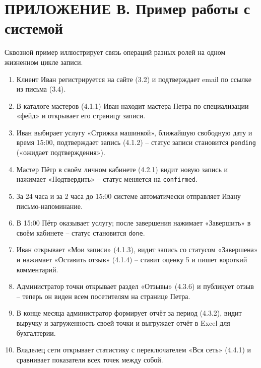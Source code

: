 \section*{ПРИЛОЖЕНИЕ В. Пример работы с системой}

Сквозной пример иллюстрирует связь операций разных ролей на одном
жизненном цикле записи.

\begin{enumerate}
  \item Клиент Иван регистрируется на сайте (3.2) и подтверждает email
        по ссылке из письма (3.4).
  \item В каталоге мастеров (4.1.1) Иван находит мастера Петра по
        специализации «фейд» и открывает его страницу записи.
  \item Иван выбирает услугу «Стрижка машинкой», ближайшую свободную дату
        и время 15:00, подтверждает запись (4.1.2) -- статус записи
        становится \texttt{pending} («ожидает подтверждения»).
  \item Мастер Пётр в своём личном кабинете (4.2.1) видит новую запись
        и нажимает «Подтвердить» -- статус меняется на \texttt{confirmed}.
  \item За 24 часа и за 2 часа до 15:00 системе автоматически отправляет
        Ивану письмо-напоминание.
  \item В 15:00 Пётр оказывает услугу; после завершения нажимает
        «Завершить» в своём кабинете -- статус становится \texttt{done}.
  \item Иван открывает «Мои записи» (4.1.3), видит запись со статусом
        «Завершена» и нажимает «Оставить отзыв» (4.1.4) -- ставит оценку
        5 и пишет короткий комментарий.
  \item Администратор точки открывает раздел «Отзывы» (4.3.6) и
        публикует отзыв -- теперь он виден всем посетителям на странице
        Петра.
  \item В конце месяца администратор формирует отчёт за период (4.3.2),
        видит выручку и загруженность своей точки и выгружает отчёт в
        Excel для бухгалтерии.
  \item Владелец сети открывает статистику с переключателем «Вся сеть»
        (4.4.1) и сравнивает показатели всех точек между собой.
\end{enumerate}


